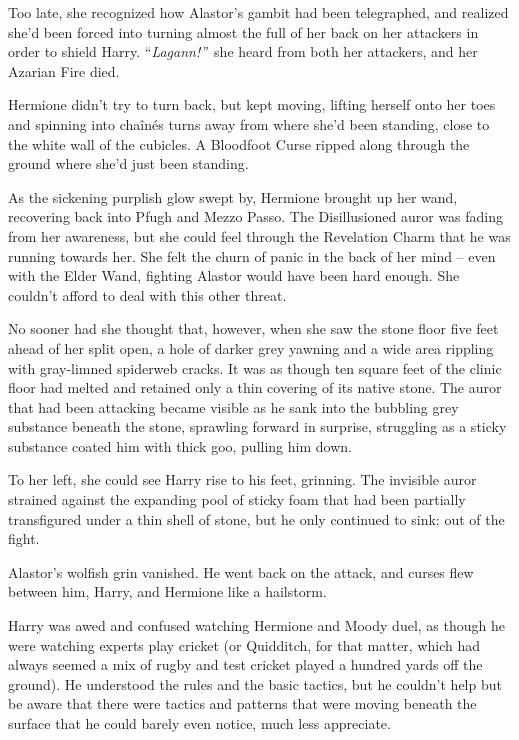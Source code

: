 Too late, she recognized how Alastor's gambit had been telegraphed, and
realized she'd been forced into turning almost the full of her back on
her attackers in order to shield Harry. ``\emph{Lagann!''}~she heard
from both her attackers, and her Azarian Fire died.

Hermione didn't try to turn back, but kept moving, lifting herself onto
her toes and spinning into chaînés turns away from where she'd been
standing, close to the white wall of the cubicles. A Bloodfoot Curse
ripped along through the ground where she'd just been standing.

As the sickening purplish glow swept by, Hermione brought up her wand,
recovering back into Pfugh and Mezzo Passo. The Disillusioned auror was
fading from her awareness, but she could feel through the Revelation
Charm that he was running towards her. She felt the churn of panic in
the back of her mind -- even with the Elder Wand, fighting Alastor would
have been hard enough. She couldn't afford to deal with this other
threat.

No sooner had she thought that, however, when she saw the stone floor
five feet ahead of her split open, a hole of darker grey yawning and a
wide area rippling with gray-limned spiderweb cracks. It was as though
ten square feet of the clinic floor had melted and retained only a thin
covering of its native stone. The auror that had been attacking became
visible as he sank into the bubbling grey substance beneath the stone,
sprawling forward in surprise, struggling as a sticky substance coated
him with thick goo, pulling him down.

To her left, she could see Harry rise to his feet, grinning. The
invisible auror strained against the expanding pool of sticky foam that
had been partially transfigured under a thin shell of stone, but he only
continued to sink: out of the fight.

Alastor's wolfish grin vanished. He went back on the attack, and curses
flew between him, Harry, and Hermione like a hailstorm.

\mybreak

Harry was awed and confused watching Hermione and Moody duel, as though
he were watching experts play cricket (or Quidditch, for that matter,
which had always seemed a mix of rugby and test cricket played a hundred
yards off the ground). He understood the rules and the basic tactics,
but he couldn't help but be aware that there were tactics and patterns
that were moving beneath the surface that he could barely even notice,
much less appreciate.

